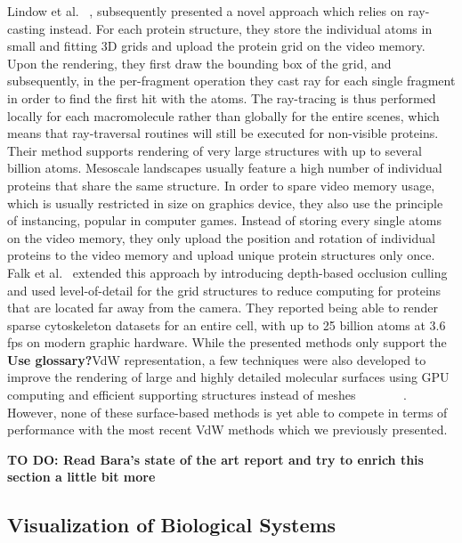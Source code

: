 Lindow et al. ~\cite{lindow2012interactive}, subsequently presented a novel approach which relies on ray-casting instead.
For each protein structure, they store the individual atoms in small and fitting 3D grids and upload the protein grid on the video memory.
Upon the rendering, they first draw the bounding box of the grid, and subsequently, in the per-fragment operation they cast ray for each single fragment in order to find the first hit with the atoms.
The ray-tracing is thus performed locally for each macromolecule rather than globally for the entire scenes, which means that ray-traversal routines will still be executed for non-visible proteins.
Their method supports rendering of very large structures with up to several billion atoms.
Mesoscale landscapes usually feature a high number of individual proteins that share the same structure.
In order to spare video memory usage, which is usually restricted in size on graphics device, they also use the principle of instancing, popular in computer games.
Instead of storing every single atoms on the video memory, they only upload the position and rotation of individual proteins to the video memory and upload unique protein structures only once.
Falk et al.~\cite{falk2013atomistic} extended this approach by introducing depth-based occlusion culling and used level-of-detail for the grid structures to reduce computing for proteins that are located far away from the camera.
They reported being able to render sparse cytoskeleton datasets for an entire cell, with up to 25 billion atoms at 3.6 fps on modern graphic hardware.
While the presented methods only support the \textbf{Use glossary?}VdW representation, a few techniques were also developed to improve the rendering of large and highly detailed molecular surfaces using GPU computing and efficient supporting structures instead of meshes ~\cite{krone2012fast}~\cite{parulek2012implicit} ~\cite{parulek2013fast} ~\cite{krone2011parallel} ~\cite{szecsi2012real}. 
However, none of these surface-based methods is yet able to compete in terms of performance with the most recent VdW methods which we previously presented.

\textbf{TO DO: Read Bara's state of the art report and try to enrich this section a little bit more}

\subsection{Visualization of Biological Systems}

